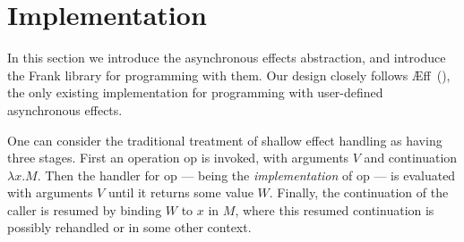 \documentclass[msc,deptreport,cs]{infthesis} %
\newcommand\aeff{{\AE}ff\xspace}
\newcommand\nondetfrank{$\mathbb{F}_{\cal{ND}}$}
\newcommand\countingfrank{$\mathbb{F}_{\cal{C}}$}
\newcommand{\todo}[1]
           {{\par\noindent\small\color{RoyalPurple}
  \framebox{\parbox{\dimexpr\linewidth-2\fboxsep-2\fboxrule}
    {\textbf{TODO:} #1}}}}
\newcommand{\sigentails}[1]{\mathbin{[{\text{\scriptsize ${#1}$}}]\hspace{-0.4ex}\text{-\!-}}\,}
\newcommand{\inferbase}[5]{#1; #3 \mathbin{#2} {#4} \Rightarrow {#5}}
\newcommand{\checkbase}[5]{#1; #3 \mathbin{#2} #5 \mathbin{:} #4}
\newcommand{\makes}[5]{\inferbase{#1}{\sigentails{#3}}{#2}{#4}{#5}}
\newcommand{\has}[5]{\checkbase{#1}{\sigentails{#3}}{#2}{#4}{#5}}
\newcommand{\infers}{\makes}
\newcommand{\checks}{\has}
\newcommand{\sigs}{\Sigma}
\begin{document}







\chapter{Implementation}
\label{chap:implementation}


In this section we introduce the asynchronous effects abstraction, and introduce
the Frank library for programming with them.
%
Our design closely follows \aeff~(\cite{ahman2020asynchronous}), the only
existing implementation for programming with user-defined asynchronous effects.

One can consider the traditional treatment of shallow effect handling as having
three stages. First an operation \textsf{op} is invoked, with arguments $V$ and
continuation $\lambda x . M$. Then the handler for \textsf{op} --- being the
\emph{implementation} of \textsf{op} --- is evaluated with arguments $V$ until
it returns some value $W$. Finally, the continuation of the caller is resumed by
binding $W$ to $x$ in $M$, where this resumed continuation is possibly rehandled
or in some other context.
\end{document}
